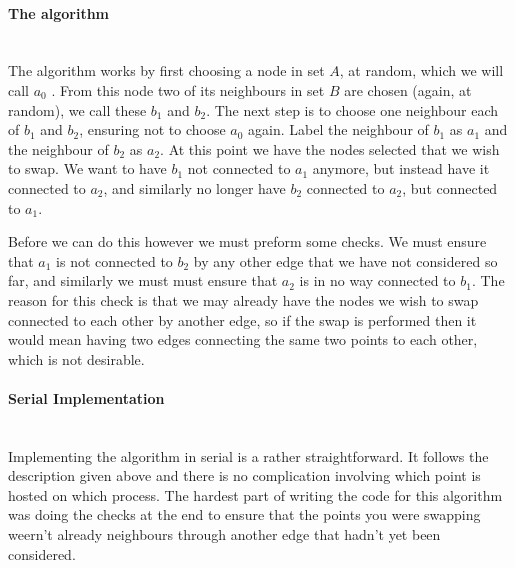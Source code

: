 \documentclass[pdftex,12pt,a4paper]{article}
\begin{document}
\paragraph{The algorithm} ~\\

The algorithm works by first choosing a node in set $A$, at random, which we will call $a_0$ . From this node two of its neighbours in set $B$ are chosen (again, at random), we call these $b_1$ and $b_2$. The next step is to choose one neighbour each of $b_1$ and $b_2$, ensuring not to choose $a_0$ again. Label the neighbour of $b_1$ as $a_1$ and the neighbour of $b_2$ as $a_2$. At this point we have the nodes selected that we wish to swap. We want to have $b_1$ not connected to $a_1$ anymore, but instead have it connected to $a_2$, and similarly no longer have $b_2$ connected to $a_2$, but connected to $a_1$.

Before we can do this however we must preform some checks. We must ensure that $a_1$ is not connected to $b_2$ by any other edge that we have not considered so far, and similarly we must must ensure that $a_2$ is in no way connected to $b_1$. The reason for this check is that we may already have the nodes we wish to swap connected to each other by another edge, so if the swap is performed then it would mean having two edges connecting the same two points to each other, which is not desirable.



\paragraph{Serial Implementation} ~\\

Implementing the algorithm in serial is a rather straightforward. It follows the description given above and there is no complication involving which point is hosted on which process. The hardest part of writing the code for this algorithm was doing the checks at the end to ensure that the points you were swapping weern't already neighbours through another edge that hadn't yet been considered.
\end{document}
